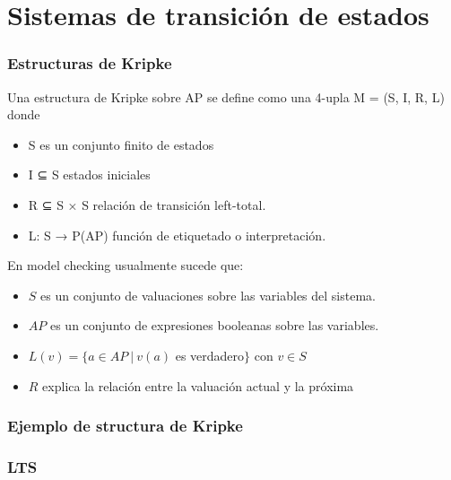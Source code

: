 \documentclass[serif]{beamer}
\begin{document}


\section{Sistemas de transición de estados}

\begin{frame}
\frametitle{Estructuras de Kripke}
Una estructura de Kripke sobre AP se define
como una 4-upla M = (S, I, R, L) donde\\[0.5cm]
\begin{itemize}
\item S es un conjunto finito de estados
\item I ⊆ S estados iniciales
\item R ⊆ S × S relación de transición left-total.
\item L: S → P(AP) función de etiquetado o
interpretación.
\end{itemize}
\end{frame}

\begin{frame}

En model checking usualmente sucede que:\\[0.5cm]
\begin{itemize}
\item $S$ es un conjunto de valuaciones sobre las variables del sistema.
\item $AP$ es un conjunto de expresiones booleanas sobre las variables.
\item $L(v) = \lbrace a \in AP~|~v(a)$ es verdadero$\rbrace$ con $v \in S$
\item $R$ explica la relación entre la valuación actual y la próxima
\end{itemize}

\end{frame}


\begin{frame}
\frametitle{Ejemplo de structura de Kripke}
\end{frame}


\begin{frame}
\frametitle{LTS}
\end{frame}
\end{document}
